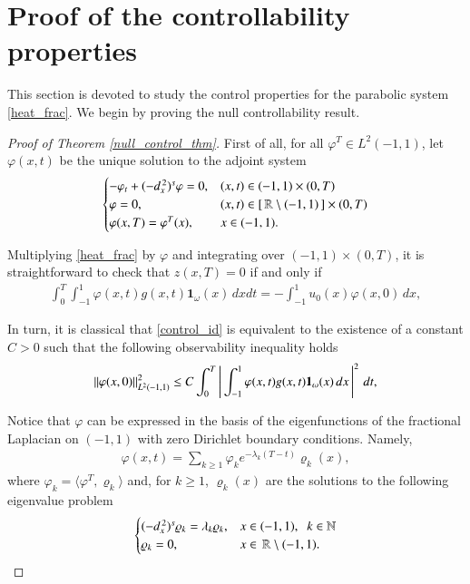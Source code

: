 \section{Proof of the controllability properties}

This section is devoted to study the control properties for the parabolic system \eqref{heat_frac}. We begin by proving the null controllability result.

\begin{proof}[Proof of Theorem \ref{null_control_thm}]
First of all, for all $\varphi^T\in L^2(-1,1)$, let $\varphi(x,t)$ be the unique solution to the adjoint system
\begin{align}\label{heat_frac_adj}
	\begin{cases}
		-\varphi_t + (-d_x^{\,2})^{s}\varphi = 0, & (x,t)\in (-1,1)\times(0,T)
		\\
		\varphi = 0, & (x,t)\in [\,\mathbb{R}\setminus(-1,1)\,]\times(0,T)
		\\
		\varphi(x,T) = \varphi^T(x), & x\in (-1,1).
	\end{cases}
\end{align}

Multiplying \eqref{heat_frac} by $\varphi$ and integrating over $(-1,1)\times (0,T)$, it is straightforward to check that $z(x,T)=0$ if and only if 
\begin{align}\label{control_id}
	\int_0^T\int_{-1}^1 \varphi(x,t)g(x,t)\mathbf{1}_{\omega}(x)\,dxdt = -\int_{-1}^1 u_0(x)\varphi(x,0)\,dx,
\end{align}

In turn, it is classical that \eqref{control_id} is equivalent to the existence of a constant $C>0$ such that the following observability inequality holds
\begin{align}\label{obs}
	{\left\|\varphi(x,0)\right\|}_{L^2(-1,1)}^2\leq C\int_0^T\left|\,\int_{-1}^1 \varphi(x,t)g(x,t)\mathbf{1}_{\omega}(x)\,dx\,\right|^2\,dt,
\end{align}

Notice that $\varphi$ can be expressed in the basis of the eigenfunctions of the fractional Laplacian on $(-1,1)$ with zero Dirichlet boundary conditions. Namely,
\begin{align}\label{adj_sol}
	\varphi(x,t) = \sum_{k\geq 1} \varphi_ke^{-\lambda_k(T-t)}\varrho_k(x), 
\end{align}
where $\varphi_k = \langle \varphi^T,\varrho_k\rangle$ and, for $k\geq 1$, $\varrho_k(x)$ are the solutions to the following eigenvalue problem 
\begin{align*}
	\begin{cases}
		(-d_x^{\,2})^{s}\varrho_k = \lambda_k\varrho_k, & x\in (-1,1), \;\; k\in\mathbb{N}
		\\
		\varrho_k = 0, & x\in \,\mathbb{R}\setminus(-1,1).
	\end{cases}
\end{align*}
	

\end{proof}
